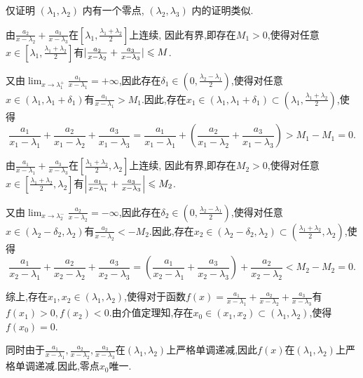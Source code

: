 \begin{solution}
    [解]
    仅证明 $(\lambda_1, \lambda_2)$ 内有一个零点, $(\lambda_2, \lambda_3)$ 内的证明类似.

    由$\frac{a_2}{x-\lambda_2} + \frac{a_3}{x-\lambda_3}$在$\left[\lambda_1, \frac{\lambda_1+\lambda_2}{2}\right]$上连续,
    因此有界,即存在$M_1 > 0$,使得对任意$x \in \left[\lambda_1, \frac{\lambda_1+\lambda_2}{2}\right]$有$|\frac{a_2}{x-\lambda_2} + \frac{a_3}{x-\lambda_3}| \leqslant M$.

    又由$\lim_{x \to \lambda_1^+} \frac{a_1}{x-\lambda_1} = +\infty$,因此存在$\delta_1 \in \left( 0, \frac{\lambda_2 - \lambda_1}{2} \right)$,使得对任意$x \in (\lambda_1, \lambda_1 + \delta_1)$有$\frac{a_1}{x-\lambda_1} > M_1$.因此,存在$x_1 \in (\lambda_1, \lambda_1 + \delta_1) \subset \left(\lambda_1, \frac{\lambda_1+\lambda_2}{2}\right)$,使得
    $$ \frac{a_1}{x_1-\lambda_1} + \frac{a_2}{x_1-\lambda_2} + \frac{a_3}{x_1-\lambda_3} = \frac{a_1}{x_1-\lambda_1} + \left( \frac{a_2}{x_1-\lambda_2} + \frac{a_3}{x_1-\lambda_3} \right) > M_1 - M_1 = 0. $$

    由$\frac{a_1}{x-\lambda_1} + \frac{a_3}{x-\lambda_3}$在$\left[\frac{\lambda_1+\lambda_2}{2}, \lambda_2\right]$上连续,
    因此有界,即存在$M_2 > 0$,使得对任意$x \in \left[\frac{\lambda_1+\lambda_2}{2}, \lambda_2\right]$有$\left|\frac{a_1}{x-\lambda_1} + \frac{a_3}{x-\lambda_3}\right| \leqslant M_2$.

    又由$\lim_{x \to \lambda_2^-} \frac{a_2}{x-\lambda_2} = -\infty$,因此存在$\delta_2 \in \left( 0, \frac{\lambda_2 - \lambda_1}{2} \right)$,使得对任意$x \in (\lambda_2 - \delta_2, \lambda_2)$有$\frac{a_2}{x-\lambda_2} < -M_2$.因此,存在$x_2 \in (\lambda_2 - \delta_2, \lambda_2) \subset \left(\frac{\lambda_1+\lambda_2}{2}, \lambda_2\right)$,使得
    $$ \frac{a_1}{x_2-\lambda_1} + \frac{a_2}{x_2-\lambda_2} + \frac{a_3}{x_2-\lambda_3} = \left( \frac{a_1}{x_2-\lambda_1} + \frac{a_3}{x_2-\lambda_3} \right) + \frac{a_2}{x_2-\lambda_2} < M_2 - M_2 = 0. $$

    综上,存在$x_1, x_2 \in (\lambda_1, \lambda_2)$,使得对于函数$f(x) = \frac{a_1}{x-\lambda_1} + \frac{a_2}{x-\lambda_2} + \frac{a_3}{x-\lambda_3}$有$f(x_1) > 0, f(x_2) < 0$.由介值定理知,存在$x_0 \in (x_1, x_2) \subset (\lambda_1, \lambda_2)$,使得$f(x_0) = 0$.

    同时由于$\frac{a_1}{x-\lambda_1}, \frac{a_2}{x-\lambda_2}, \frac{a_3}{x-\lambda_3}$在$(\lambda_1, \lambda_2)$上严格单调递减,因此$f(x)$在$(\lambda_1, \lambda_2)$上严格单调递减.因此,零点$x_0$唯一.
\end{solution}


